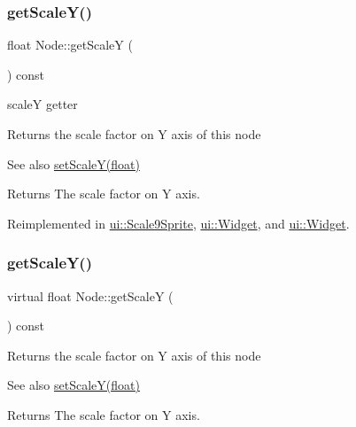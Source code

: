 \subsubsection{\texorpdfstring{get\+Scale\+Y()}{getScaleY()}\hspace{0.1cm}{\footnotesize\ttfamily [1/2]}}
{\footnotesize\ttfamily float Node\+::get\+ScaleY (\begin{DoxyParamCaption}{ }\end{DoxyParamCaption}) const\hspace{0.3cm}{\ttfamily [virtual]}}



scaleY getter 

Returns the scale factor on Y axis of this node

\begin{DoxySeeAlso}{See also}
{\ttfamily \hyperlink{classNode_aec805a1fa9e8e1038556e468138bb804}{set\+Scale\+Y(float)}}
\end{DoxySeeAlso}
\begin{DoxyReturn}{Returns}
The scale factor on Y axis. 
\end{DoxyReturn}


Reimplemented in \hyperlink{classui_1_1Scale9Sprite_a7bab472ed47f8eb5d061120915f9c2d7}{ui\+::\+Scale9\+Sprite}, \hyperlink{classui_1_1Widget_af9953371b66c5e1a608c5f7f009093fd}{ui\+::\+Widget}, and \hyperlink{classui_1_1Widget_a932098cecbcccacf326a500f9c8177a7}{ui\+::\+Widget}.

\mbox{\label{classNode_a634136734ab9cce2a3797a621b788c68}} 
\subsubsection{\texorpdfstring{get\+Scale\+Y()}{getScaleY()}\hspace{0.1cm}{\footnotesize\ttfamily [2/2]}}
{\footnotesize\ttfamily virtual float Node\+::get\+ScaleY (\begin{DoxyParamCaption}{ }\end{DoxyParamCaption}) const\hspace{0.3cm}{\ttfamily [virtual]}}

Returns the scale factor on Y axis of this node

\begin{DoxySeeAlso}{See also}
{\ttfamily \hyperlink{classNode_aec805a1fa9e8e1038556e468138bb804}{set\+Scale\+Y(float)}}
\end{DoxySeeAlso}
\begin{DoxyReturn}{Returns}
The scale factor on Y axis. 
\end{DoxyReturn}


